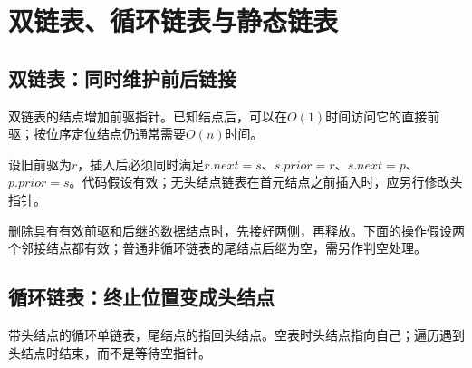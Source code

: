 \hypertarget{ds2-variants}{}

\section{双链表、循环链表与静态链表}\label{ds2-variants}

\hypertarget{ds2-double}{}

\subsection{双链表：同时维护前后链接}\label{ds2-double}

\hypertarget{ds2-double-text}{}

双链表的结点增加前驱指针。已知结点后，可以在$O(1)$时间访问它的直接前驱；按位序定位结点仍通常需要$O(n)$时间。


\hypertarget{ds2-double-insert}{}

\Needspace{153.6pt}

\hypertarget{ds2-double-invariant}{}

设旧前驱为$r$，插入后必须同时满足$r.next=s$、$s.prior=r$、$s.next=p$、$p.prior=s$。代码假设有效；无头结点链表在首元结点之前插入时，应另行修改头指针。


\hypertarget{ds2-double-delete}{}

删除具有有效前驱和后继的数据结点时，先接好两侧，再释放。下面的操作假设两个邻接结点都有效；普通非循环链表的尾结点后继为空，需另作判空处理。


\hypertarget{ds2-double-delete-code}{}

\Needspace{76.8pt}

\hypertarget{ds2-circular}{}

\subsection{循环链表：终止位置变成头结点}\label{ds2-circular}

\hypertarget{ds2-circular-text}{}

带头结点的循环单链表，尾结点的指回头结点。空表时头结点指向自己；遍历遇到头结点时结束，而不是等待空指针。


\hypertarget{ds2-circular-figure}{}


